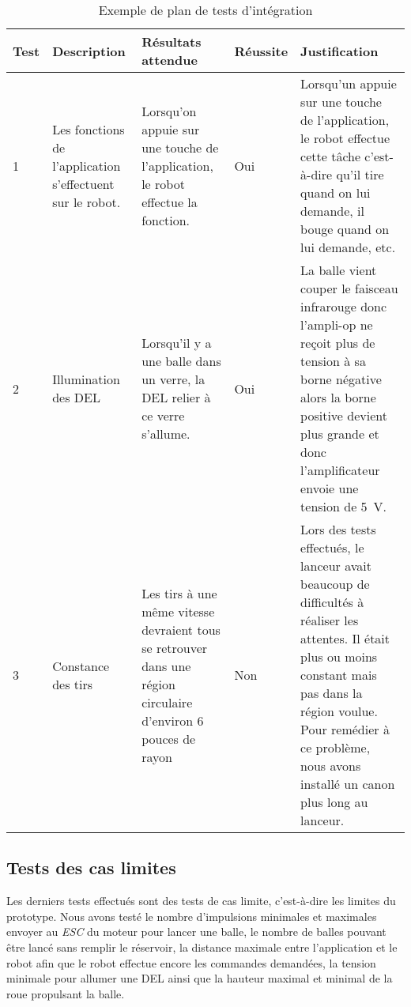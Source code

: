 \begin{table}[h!]
    \centering
    \begin{tabular}{p{0.25in}p{1.5in}p{1.5in}p{0.5in}p{1.5in}}
        \hline
        \bfseries Test & \bfseries Description & \bfseries Résultats attendue & \bfseries Réussite & \bfseries Justification \\
        \hline\hline
        1 & Les fonctions de l’application s’effectuent sur le robot. & Lorsqu’on appuie sur une touche de l’application, le robot effectue la fonction. & Oui & Lorsqu’un appuie sur une touche de l’application, le robot effectue cette tâche c’est-à-dire qu’il tire quand on lui demande, il bouge quand on lui demande, etc. \\
        2 & Illumination des DEL & Lorsqu’il y a une balle dans un verre, la DEL relier à ce verre s’allume. & Oui & La balle vient couper le faisceau infrarouge donc l’ampli-op ne reçoit plus de tension à sa borne négative alors la borne positive devient plus grande et donc l’amplificateur envoie une tension de 5~V. \\
        3 & Constance des tirs & Les tirs à une même vitesse devraient tous se retrouver dans une région circulaire d’environ 6 pouces de rayon & Non & Lors des tests effectués, le lanceur avait beaucoup de difficultés à réaliser les attentes. Il était plus ou moins constant mais pas dans la région voulue. Pour remédier à ce problème, nous avons installé un canon plus long au lanceur. \\
        \hline
    \end{tabular}
    \caption{Exemple de plan de tests d'intégration}
    \label{tab:s3-test-integration}
\end{table}

\subsection{Tests des cas limites}

Les derniers tests effectués sont des tests de cas limite, c’est-à-dire les limites du prototype.
Nous avons testé le nombre d’impulsions minimales et maximales envoyer au \emph{ESC} du moteur pour lancer une balle, le nombre de balles pouvant être lancé sans remplir le réservoir, la distance maximale entre l’application et le robot afin que le robot effectue encore les commandes demandées, la tension minimale pour allumer une DEL ainsi que la hauteur maximal et minimal de la roue propulsant la balle.

